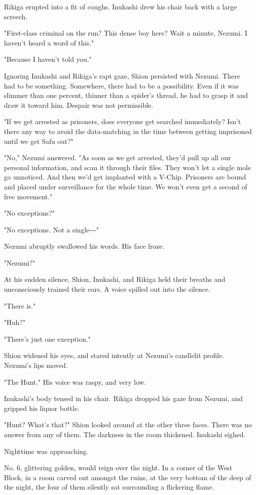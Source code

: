 Rikiga erupted into a fit of coughs. Inukashi drew his chair back with a
large screech.

"First-class criminal on the run? This dense boy here? Wait a minute,
Nezumi. I haven't heard a word of this."

"Because I haven't told you."

Ignoring Inukashi and Rikiga's rapt gaze, Shion persisted with Nezumi.
There had to be something. Somewhere, there had to be a possibility.
Even if it was slimmer than one percent, thinner than a spider's thread,
he had to grasp it and draw it toward him. Despair was not permissible.

"If we get arrested as prisoners, does everyone get searched
immediately? Isn't there any way to avoid the data-matching in the time
between getting imprisoned until we get Safu out?"

"No," Nezumi answered. "As soon as we get arrested, they'd pull up all
our personal information, and scan it through their files. They won't
let a single mole go unnoticed. And then we'd get implanted with a
V-Chip. Prisoners are bound and placed under surveillance for the whole
time. We won't even get a second of free movement."

"No exceptions?"

"No exceptions. Not a single―"

Nezumi abruptly swallowed his words. His face froze.

"Nezumi?"

At his sudden silence, Shion, Inukashi, and Rikiga held their breaths
and unconsciously trained their ears. A voice spilled out into the
silence.

"There is."

"Huh?"

"There's just one exception."

Shion widened his eyes, and stared intently at Nezumi's candlelit
profile. Nezumi's lips moved.

"The Hunt." His voice was raspy, and very low.

Inukashi's body tensed in his chair. Rikiga dropped his gaze from
Nezumi, and gripped his liquor bottle.

"Hunt? What's that?" Shion looked around at the other three faces. There
was no answer from any of them. The darkness in the room thickened.
Inukashi sighed.

Nighttime was approaching.

No. 6, glittering golden, would reign over the night. In a corner of the
West Block, in a room carved out amongst the ruins, at the very bottom
of the deep of the night, the four of them silently sat surrounding a
flickering flame.

